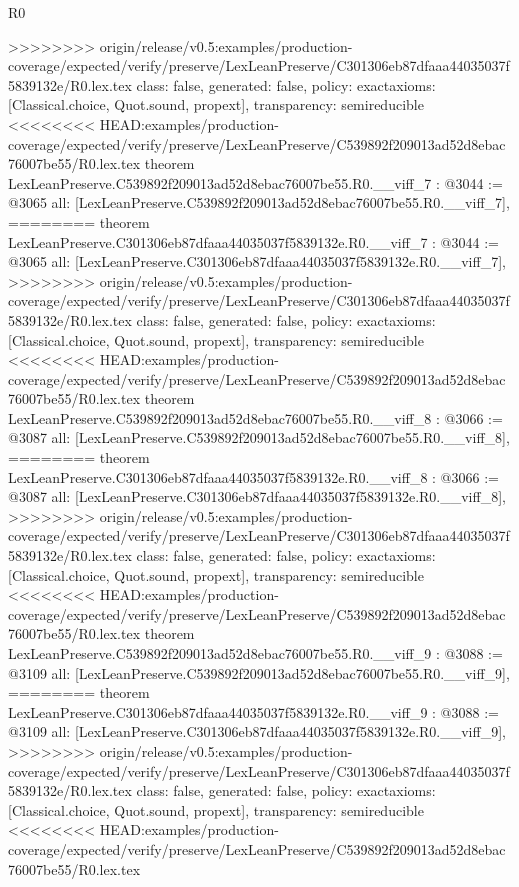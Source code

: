 \begin{lexlean}{R0}
\begin{coremodule}
{{{{{{{{{{{{{{{{{{{{{{{{{{{{{{{{{{{{{{{{{{{{{{{{{{{{{{{{{{{{{{{{>>>>>>>> origin/release/v0.5:examples/production-coverage/expected/verify/preserve/LexLeanPreserve/C301306eb87dfaaa44035037f5839132e/R0.lex.tex
  class: false,
  generated: false,
  policy: exact{axioms: [Classical.choice, Quot.sound, propext]},
  transparency: semireducible
}
<<<<<<<< HEAD:examples/production-coverage/expected/verify/preserve/LexLeanPreserve/C539892f209013ad52d8ebac76007be55/R0.lex.tex
theorem LexLeanPreserve.C539892f209013ad52d8ebac76007be55.R0.__viff_7 : @3044 := @3065 {
  all: [LexLeanPreserve.C539892f209013ad52d8ebac76007be55.R0.__viff_7],
========
theorem LexLeanPreserve.C301306eb87dfaaa44035037f5839132e.R0.__viff_7 : @3044 := @3065 {
  all: [LexLeanPreserve.C301306eb87dfaaa44035037f5839132e.R0.__viff_7],
>>>>>>>> origin/release/v0.5:examples/production-coverage/expected/verify/preserve/LexLeanPreserve/C301306eb87dfaaa44035037f5839132e/R0.lex.tex
  class: false,
  generated: false,
  policy: exact{axioms: [Classical.choice, Quot.sound, propext]},
  transparency: semireducible
}
<<<<<<<< HEAD:examples/production-coverage/expected/verify/preserve/LexLeanPreserve/C539892f209013ad52d8ebac76007be55/R0.lex.tex
theorem LexLeanPreserve.C539892f209013ad52d8ebac76007be55.R0.__viff_8 : @3066 := @3087 {
  all: [LexLeanPreserve.C539892f209013ad52d8ebac76007be55.R0.__viff_8],
========
theorem LexLeanPreserve.C301306eb87dfaaa44035037f5839132e.R0.__viff_8 : @3066 := @3087 {
  all: [LexLeanPreserve.C301306eb87dfaaa44035037f5839132e.R0.__viff_8],
>>>>>>>> origin/release/v0.5:examples/production-coverage/expected/verify/preserve/LexLeanPreserve/C301306eb87dfaaa44035037f5839132e/R0.lex.tex
  class: false,
  generated: false,
  policy: exact{axioms: [Classical.choice, Quot.sound, propext]},
  transparency: semireducible
}
<<<<<<<< HEAD:examples/production-coverage/expected/verify/preserve/LexLeanPreserve/C539892f209013ad52d8ebac76007be55/R0.lex.tex
theorem LexLeanPreserve.C539892f209013ad52d8ebac76007be55.R0.__viff_9 : @3088 := @3109 {
  all: [LexLeanPreserve.C539892f209013ad52d8ebac76007be55.R0.__viff_9],
========
theorem LexLeanPreserve.C301306eb87dfaaa44035037f5839132e.R0.__viff_9 : @3088 := @3109 {
  all: [LexLeanPreserve.C301306eb87dfaaa44035037f5839132e.R0.__viff_9],
>>>>>>>> origin/release/v0.5:examples/production-coverage/expected/verify/preserve/LexLeanPreserve/C301306eb87dfaaa44035037f5839132e/R0.lex.tex
  class: false,
  generated: false,
  policy: exact{axioms: [Classical.choice, Quot.sound, propext]},
  transparency: semireducible
}
<<<<<<<< HEAD:examples/production-coverage/expected/verify/preserve/LexLeanPreserve/C539892f209013ad52d8ebac76007be55/R0.lex.tex
}}}}}}}}}}}}}}}}}}}}}}}}}}}}}}}}}}}}}}}}}}}}}}}}}}}}}}}}}}}}}}}}}}
\end{coremodule}
\end{lexlean}
